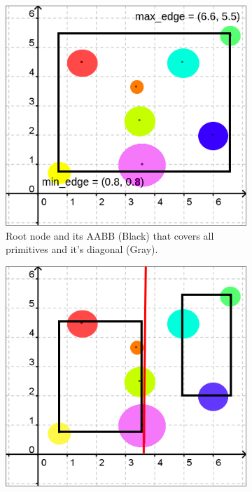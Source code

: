 \documentclass[11pt,a4paper]{article}
\begin{document}
\begin{figure}[h]	
     \centering
     \begin{subfigure}[t]{0.3\textwidth}
         \centering
         \includegraphics[width=\textwidth]{images/example_bvh/2.png}
         \captionsetup{justification=centering,margin=0.1cm}
         \caption{Root node and its AABB (Black) that covers all primitives and it's diagonal (Gray).}
         \label{fig:pi_4000}
     \end{subfigure}
     \hfill
     \begin{subfigure}[t]{0.3\textwidth}
         \centering
         \includegraphics[width=\textwidth]{images/example_bvh/3.png}

\end{subfigure}
\end{figure}
\end{document}
